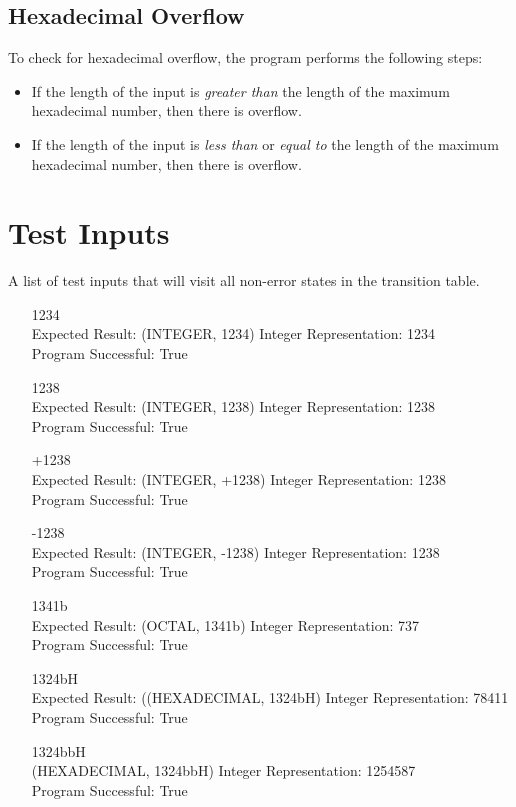\documentclass[11pt]{article}
\begin{document}
\subsection{Hexadecimal Overflow}
To check for hexadecimal overflow, the program performs the following steps:
\begin{itemize}
\item If the length of the input is \textit{greater than} the length of the maximum hexadecimal number, then there is overflow.
\item If the length of the input is \textit{less than} or \textit{equal to} the length of the maximum hexadecimal number, then there is overflow.
\end{itemize}

\newpage
\section{Test Inputs}
A list of test inputs that will visit all non-error states in the transition table.
\begin{itemize}
\item[1234] \hfill \\
Expected Result: (INTEGER, 1234) Integer Representation: 1234\\
Program Successful: True
\item[1238] \hfill \\
Expected Result: (INTEGER, 1238) Integer Representation: 1238\\
Program Successful: True
\item[+1238] \hfill \\
Expected Result: (INTEGER, +1238) Integer Representation: 1238\\
Program Successful: True
\item[-1238] \hfill \\
Expected Result: (INTEGER, -1238) Integer Representation: 1238\\
Program Successful: True
\item[1341b] \hfill \\
Expected Result: (OCTAL, 1341b) Integer Representation: 737\\
Program Successful: True
\item[1324bH] \hfill \\
Expected Result: ((HEXADECIMAL, 1324bH) Integer Representation: 78411\\
Program Successful: True
\item[1324bbH] \hfill \\
(HEXADECIMAL, 1324bbH) Integer Representation: 1254587\\
Program Successful: True
\end{itemize}
\end{document}
